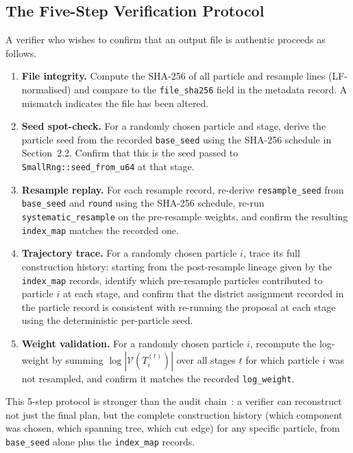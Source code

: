 \subsection{The Five-Step Verification Protocol}

A verifier who wishes to confirm that an \smc{} output file is authentic
proceeds as follows.

\begin{enumerate}
  \item \textbf{File integrity.}
        Compute the SHA-256 of all particle and resample lines (LF-normalised)
        and compare to the \texttt{file\_sha256} field in the metadata record.
        A mismatch indicates the file has been altered.

  \item \textbf{Seed spot-check.}
        For a randomly chosen particle and stage, derive the particle seed
        from the recorded \texttt{base\_seed} using the SHA-256 schedule
        in Section~2.2. Confirm that this is the seed passed to
        \texttt{SmallRng::seed\_from\_u64} at that stage.

  \item \textbf{Resample replay.}
        For each resample record, re-derive \texttt{resample\_seed} from
        \texttt{base\_seed} and \texttt{round} using the SHA-256 schedule,
        re-run \texttt{systematic\_resample} on the pre-resample weights,
        and confirm the resulting \texttt{index\_map} matches the recorded one.

  \item \textbf{Trajectory trace.}
        For a randomly chosen particle $i$, trace its full construction
        history: starting from the post-resample lineage given by the
        \texttt{index\_map} records, identify which pre-resample particles
        contributed to particle $i$ at each stage, and confirm that the
        district assignment recorded in the particle record is consistent
        with re-running the proposal at each stage using the deterministic
        per-particle seed.

  \item \textbf{Weight validation.}
        For a randomly chosen particle $i$, recompute the log-weight by
        summing $\log|\mathcal{V}(T_i^{(t)})|$ over all stages $t$ for
        which particle $i$ was not resampled, and confirm it matches the
        recorded \texttt{log\_weight}.
\end{enumerate}

This 5-step protocol is stronger than the \flip{} audit chain~\citep{g8paper}:
a verifier can reconstruct not just the final plan, but the complete
construction history (which component was chosen, which spanning tree, which
cut edge) for any specific particle, from \texttt{base\_seed} alone plus the
\texttt{index\_map} records.

